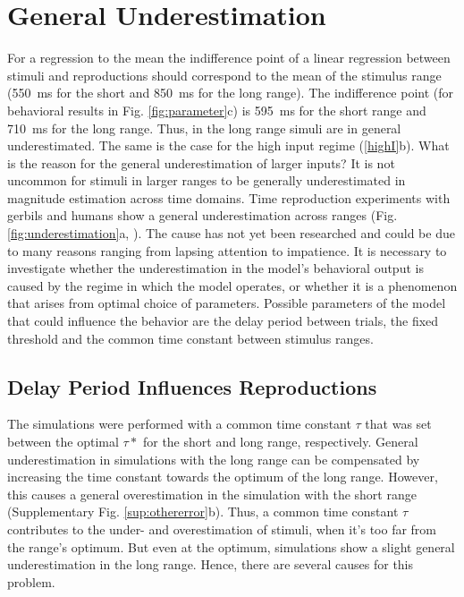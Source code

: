 \documentclass[10pt]{article}
\begin{document}
\section{General Underestimation}
For a regression to the mean the indifference point of a linear regression between stimuli and reproductions should correspond to the mean of the stimulus range (550~ms for the short and 850~ms for the long range).
The indifference point (for behavioral results in Fig. \ref{fig:parameter}c) is 595~ms for the short range and 710~ms for the long range. Thus, in the long range simuli are in general underestimated. 
The same is the case for the high input regime (\ref{highI}b).
What is the reason for the general underestimation of larger inputs? 
It is not uncommon for stimuli in larger ranges to be generally underestimated in magnitude estimation across time domains. Time reproduction experiments with gerbils and humans show a general underestimation across ranges (Fig. \ref{fig:underestimation}a, \cite{Henke2022}). 
The cause has not yet been researched and could be due to many reasons ranging from lapsing attention to impatience. 
It is necessary to investigate whether the underestimation in the model's behavioral output is caused by the regime in which the model operates, or whether it is a phenomenon that arises from optimal choice of parameters.
Possible parameters of the model that could influence the behavior are the delay period between trials, the fixed threshold and the common time constant between stimulus ranges. 

\subsection{Delay Period Influences Reproductions}
The simulations were performed with a common time constant $\tau$ that was set between the optimal $\tau*$  for the short and long range, respectively.
General underestimation in simulations with the long range can be compensated by increasing the time constant towards the optimum of the long range. However, this causes a general overestimation in the simulation with the short range (Supplementary Fig. \ref{sup:othererror}b). 
Thus, a common time constant $\tau$ contributes to the under- and overestimation of stimuli, when it's too far from the range's optimum. But even at the optimum, simulations show a slight general underestimation in the long range.
Hence, there are several causes for this problem.
\end{document}
